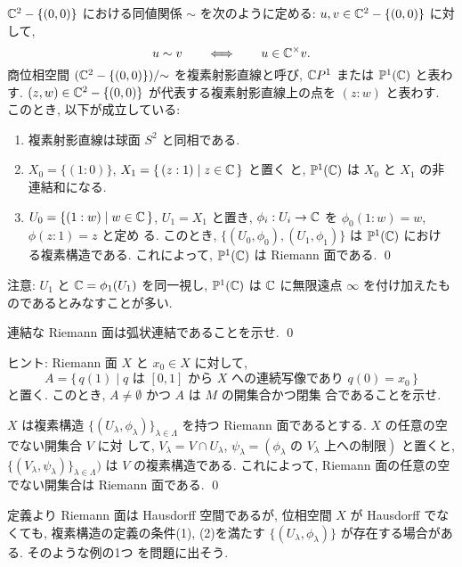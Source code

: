 \documentclass[12pt,twoside]{jarticle}
\def\setminus{-}
\def\C{{\Bbb C}} %
\def\P{{\Bbb P}}
\begin{document}
\begin{question}[複素射影直線]\label{q:proj-line1}\qstar{*}
  $\C^2 \setminus \{(0,0)\}$ における同値関係 $\sim$ を次のように定める: %
  $u, v \in \C^2 \setminus\{(0,0)\}$ に対して,
  \[
    u \sim v
    \qquad\Longleftrightarrow\qquad
    u \in \C^{\times} v.
  \]
  商位相空間 $(\C^2 \setminus \{(0,0)\})/{\sim}$ を複素射影直線と呼び, %
  $\C P^1$ または $\P^1(\C)$ と表わす. %
  $(z,w)\in\C^2\setminus\{(0,0)\}$ が代表する複素射影直線上の点を %
  $(z:w)$ と表わす. このとき, 以下が成立している: %
  \begin{enumerate}
  \item 複素射影直線は球面 $S^2$ と同相である. 
  \item $X_0 = \{(1:0)\}$, $X_1 = \{\,(z:1) \mid z \in \C \,\}$ と置く
    と, $\P^1(\C)$ は $X_0$ と $X_1$ の非連結和になる.
  \item $U_0 = \{(1:w) \mid w \in \C \,\}$, $U_1 = X_1$ と置き,
    $\phi_i : U_i \to \C$ を $\phi_0(1:w) = w$, $\phi(z:1) = z$ と定め
    る. このとき, $\{(U_0,\phi_0),(U_1,\phi_1)\}$ は $\P^1(\C)$ におけ
    る複素構造である. これによって, $\P^1(\C)$ は Riemann 面である.
    \qed
  \end{enumerate}
\end{question}

\noindent 注意: $U_1$ と $\C=\phi_1(U_1)$ を同一視し, $\P^1(\C)$ は %
$\C$ に無限遠点 $\infty$ を付け加えたものであるとみなすことが多い.

\begin{question}
  連結な Riemann 面は弧状連結であることを示せ. \qed
\end{question}

\noindent ヒント: Riemann 面 $X$ と $x_0 \in X$ に対して, %
\[
  A
  =
  \{\,
    q(1) 
  \mid
    \text{$q$ は $[0,1]$ から $X$ への連続写像であり $q(0)=x_0$}
  \,\}
\] %
と置く. このとき, $A \ne \emptyset$ かつ $A$ は $M$ の開集合かつ閉集
合であることを示せ.

\begin{question}
  $X$ は複素構造 $\{(U_\lambda,\phi_\lambda)\}_{\lambda\in\Lambda}$ 
  を持つ Riemann 面であるとする.  $X$ の任意の空でない開集合 $V$ に対
  して, $V_\lambda = V \cap U_\lambda$, %
  $\psi_\lambda = (\text{$\phi_\lambda$ の $V_\lambda$ 上への制限})$ 
  と置くと, $\{(V_\lambda,\psi_\lambda)\}_{\lambda\in\Lambda})$ は $V$
  の複素構造である. これによって, Riemann 面の任意の空でない開集合は 
  Riemann 面である. \qed
\end{question}

定義より Riemann 面は Hausdorff 空間であるが, 位相空間 $X$ が 
Hausdorff でなくても, 複素構造の定義の条件(1), (2)を満たす %
$\{(U_\lambda,\phi_\lambda)\}$ が存在する場合がある. そのような例の1つ
を問題に出そう.
\end{document}
